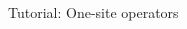\begin{frame}[fragile]{Tutorial: One-site operators}
\begin{columns}
\begin{column}{4.5cm}
\end{column}

\end{columns}

\end{frame}
